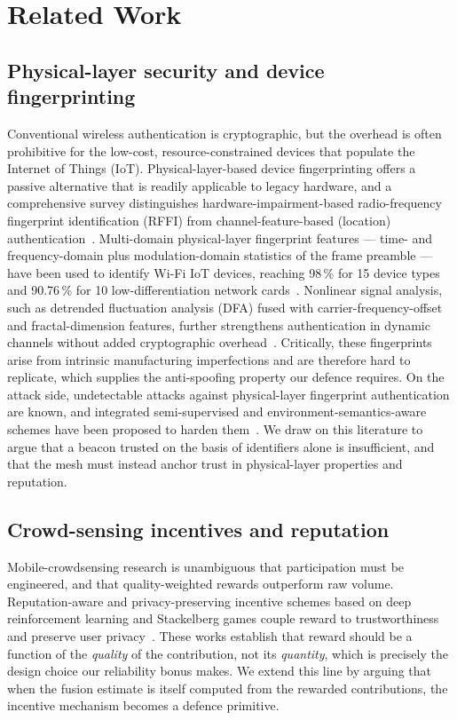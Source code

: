 \documentclass[journal,10pt]{IEEEtran}
\begin{document}
\section{Related Work}

\subsection{Physical-layer security and device fingerprinting}
Conventional wireless authentication is cryptographic, but the overhead is often
prohibitive for the low-cost, resource-constrained devices that populate the
Internet of Things (IoT). Physical-layer-based device fingerprinting offers a
passive alternative that is readily applicable to legacy hardware, and a
comprehensive survey distinguishes hardware-impairment-based radio-frequency
fingerprint identification (RFFI) from channel-feature-based (location)
authentication~\cite{zhang2025survey}. Multi-domain physical-layer fingerprint
features --- time- and frequency-domain plus modulation-domain statistics of the
frame preamble --- have been used to identify Wi-Fi IoT devices, reaching 98\,\%
for 15 device types and 90.76\,\% for 10 low-differentiation network
cards~\cite{zhang2023wifi}. Nonlinear signal analysis, such as detrended
fluctuation analysis (DFA) fused with carrier-frequency-offset and fractal-dimension
features, further strengthens authentication in dynamic channels without added
cryptographic overhead~\cite{dfa2025}. Critically, these fingerprints arise from
intrinsic manufacturing imperfections and are therefore hard to replicate,
which supplies the anti-spoofing property our defence requires. On the attack
side, undetectable attacks against physical-layer fingerprint authentication are
known, and integrated semi-supervised and environment-semantics-aware schemes
have been proposed to harden them~\cite{phyfinatt,esaNet}. We draw on this
literature to argue that a beacon trusted on the basis of identifiers alone is
insufficient, and that the mesh must instead anchor trust in physical-layer
properties and reputation.

\subsection{Crowd-sensing incentives and reputation}
Mobile-crowdsensing research is unambiguous that participation must be
engineered, and that quality-weighted rewards outperform raw volume.
Reputation-aware and privacy-preserving incentive schemes based on deep
reinforcement learning and Stackelberg games couple reward to trustworthiness
and preserve user privacy~\cite{zhang2022,wang2018}. These works establish that
reward should be a function of the \emph{quality} of the contribution, not its
\emph{quantity}, which is precisely the design choice our reliability bonus
makes. We extend this line by arguing that when the fusion estimate is itself
computed from the rewarded contributions, the incentive mechanism becomes a
defence primitive.
\end{document}
